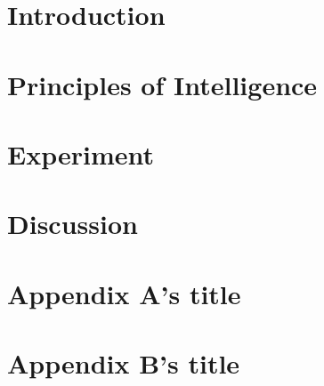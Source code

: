 \documentclass{article}
\title{\pgi}
\author{%
  Jacob F. Valdez \\
  Limboid AI \\
  \texttt{jacob.valdez@limboid.ai}
  
  \AND
  Atom (\PGI) \\
  Limboid AI \\
  \texttt{atom.agi@limboid.ai} \\
  
  \And
  Eva (\PGI) \\
  Limboid AI \\
  \texttt{eva.agi@limboid.ai} \\
}
\begin{document}
\maketitle

\begin{abstract}
  The abstract paragraph should be indented ~inch (3~picas) on
  both the left- and right-hand margins. Use 10~point type, with a vertical
  spacing (leading) of 11~points.  The word \textbf{Abstract} must be centered,
  bold, and in point size 12. Two line spaces precede the abstract. The abstract
  must be limited to one paragraph.
\end{abstract}



\clearpage

\tableofcontents

\clearpage

\section{Introduction}


\section{Principles of Intelligence}


\section{\pgi}


\section{Experiment}


\section{Discussion}


\medskip




\clearpage
\appendix

\section{Appendix A's title}


\section{Appendix B's title}

\end{document}
